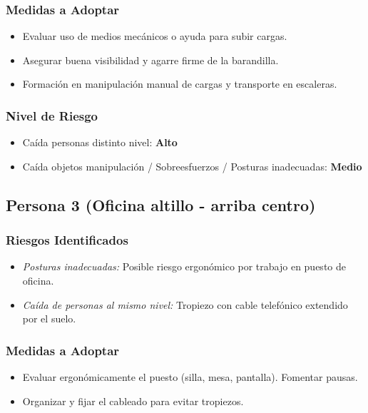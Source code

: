 \documentclass[12pt,a4paper]{article}
\begin{document}
	\subsubsection{Medidas a Adoptar}
	\begin{itemize}
		\item Evaluar uso de medios mecánicos o ayuda para subir cargas.
		\item Asegurar buena visibilidad y agarre firme de la barandilla.
		\item Formación en manipulación manual de cargas y transporte en escaleras.
	\end{itemize}
	
	\subsubsection{Nivel de Riesgo}
	\begin{itemize}
		\item Caída personas distinto nivel: \textbf{Alto}
		\item Caída objetos manipulación / Sobreesfuerzos / Posturas inadecuadas: \textbf{Medio}
	\end{itemize}
	
	\bigskip\hrulefill\bigskip
	
	\subsection{Persona 3 (Oficina altillo - arriba centro)}
	
	\subsubsection{Riesgos Identificados}
	\begin{itemize}
		\item \textit{Posturas inadecuadas:} Posible riesgo ergonómico por trabajo en puesto de oficina.
		\item \textit{Caída de personas al mismo nivel:} Tropiezo con cable telefónico extendido por el suelo.
	\end{itemize}
	
	\subsubsection{Medidas a Adoptar}
	\begin{itemize}
		\item Evaluar ergonómicamente el puesto (silla, mesa, pantalla). Fomentar pausas.
		\item Organizar y fijar el cableado para evitar tropiezos.
	\end{itemize}
	
\end{document}
